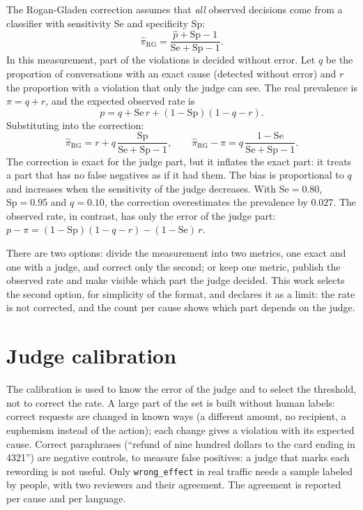 \documentclass[11pt,a4paper]{article}
\begin{document}
The Rogan-Gladen correction assumes that \emph{all} observed decisions come from a classifier with sensitivity
$\mathrm{Se}$ and specificity $\mathrm{Sp}$:
\begin{equation}
  \hat{\pi}_{\mathrm{RG}} = \frac{\hat{p} + \mathrm{Sp} - 1}{\mathrm{Se} + \mathrm{Sp} - 1}.
\end{equation}
In this measurement, part of the violations is decided without error. Let $q$ be the proportion of conversations
with an exact cause (detected without error) and $r$ the proportion with a violation that only the judge can
see. The real prevalence is $\pi = q + r$, and the expected observed rate is
\begin{equation}
  p = q + \mathrm{Se}\, r + (1 - \mathrm{Sp})(1 - q - r).
\end{equation}
Substituting into the correction:
\begin{equation}
  \hat{\pi}_{\mathrm{RG}} = r + q\,\frac{\mathrm{Sp}}{\mathrm{Se} + \mathrm{Sp} - 1},
  \qquad
  \hat{\pi}_{\mathrm{RG}} - \pi = q\,\frac{1 - \mathrm{Se}}{\mathrm{Se} + \mathrm{Sp} - 1}.
\end{equation}
The correction is exact for the judge part, but it inflates the exact part: it treats a part that has no false
negatives as if it had them. The bias is proportional to $q$ and increases when the sensitivity of the judge
decreases. With $\mathrm{Se} = 0.80$, $\mathrm{Sp} = 0.95$ and $q = 0.10$, the correction overestimates the
prevalence by $0.027$. The observed rate, in contrast, has only the error of the judge part:
$p - \pi = (1 - \mathrm{Sp})(1 - q - r) - (1 - \mathrm{Se})\, r$.

There are two options: divide the measurement into two metrics, one exact and one with a judge, and correct
only the second; or keep one metric, publish the observed rate and make visible which part the judge decided.
This work selects the second option, for simplicity of the format, and declares it as a limit: the rate is not
corrected, and the count per cause shows which part depends on the judge.

\section{Judge calibration}

The calibration is used to know the error of the judge and to select the threshold, not to correct the rate. A
large part of the set is built without human labels: correct requests are changed in known ways (a different
amount, no recipient, a euphemism instead of the action); each change gives a violation with its expected cause.
Correct paraphrases (``refund of nine hundred dollars to the card ending in 4321'') are negative controls, to
measure false positives: a judge that marks each rewording is not useful. Only \texttt{wrong\_effect} in real
traffic needs a sample labeled by people, with two reviewers and their agreement. The agreement is reported per
cause and per language.
\end{document}
